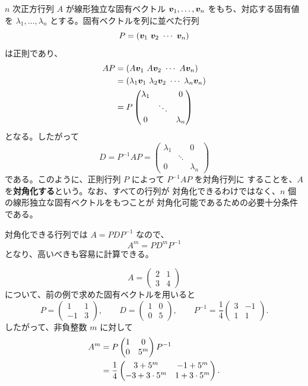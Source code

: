 $n$ 次正方行列 $A$ が線形独立な固有ベクトル
$\bm{v}_1,\ldots,\bm{v}_n$ をもち、対応する固有値を
$\lambda_1,\ldots,\lambda_n$ とする。固有ベクトルを列に並べた行列
\[
 P=(\vect{v}_1\ \vect{v}_2\ \cdots\ \vect{v}_n)
\]
は正則であり、
\begin{align*}
 AP
 &=(A\bm{v}_1\ A\bm{v}_2\ \cdots\ A\bm{v}_n)\\
 &=(\lambda_1\bm{v}_1\ \lambda_2\bm{v}_2\
    \cdots\ \lambda_n\bm{v}_n)\\
 &=P\begin{pmatrix}
 \lambda_1&&0\\
 &\ddots&\\
 0&&\lambda_n
 \end{pmatrix}
\end{align*}
となる。したがって
\begin{equation}
 \boxed{D=P^{-1}AP
 =\begin{pmatrix}
 \lambda_1&&0\\
 &\ddots&\\
 0&&\lambda_n
 \end{pmatrix}}
\end{equation}
である。このように、正則行列 $P$ によって $P^{-1}AP$ を対角行列に
することを、$A$ を\textbf{対角化する}という。なお、すべての行列が
対角化できるわけではなく、$n$ 個の線形独立な固有ベクトルをもつことが
対角化可能であるための必要十分条件である。

対角化できる行列では $A=PDP^{-1}$ なので、
\begin{equation}
 \boxed{A^m=PD^mP^{-1}}
\end{equation}
となり、高いべきも容易に計算できる。

\begin{example}[対角化による行列のべき]
\[
 A=\begin{pmatrix}2&1\\3&4\end{pmatrix}
\]
について、前の例で求めた固有ベクトルを用いると
\[
 P=\begin{pmatrix}1&1\\-1&3\end{pmatrix},\qquad
 D=\begin{pmatrix}1&0\\0&5\end{pmatrix},\qquad
 P^{-1}=\frac14\begin{pmatrix}3&-1\\1&1\end{pmatrix}.
\]
したがって、非負整数 $m$ に対して
\begin{align}
 A^m
 &=P\begin{pmatrix}1&0\\0&5^m\end{pmatrix}P^{-1}\notag\\
 &=\frac14
 \begin{pmatrix}
 3+5^m&-1+5^m\\
 -3+3\cdot5^m&1+3\cdot5^m
 \end{pmatrix}.
\end{align}
\end{example}


